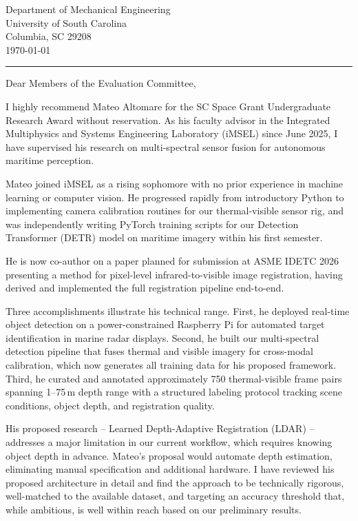 \documentclass[12pt]{article}
\begin{document}
\noindent
Department of Mechanical Engineering\\
University of South Carolina\\
Columbia, SC 29208\\
\today

\noindent
{\color{garnet}\rule{\textwidth}{0.5pt}}

\vspace{0.2em}

\noindent
Dear Members of the Evaluation Committee,

I highly recommend Mateo Altomare for the SC Space Grant Undergraduate Research Award without reservation. As his faculty advisor in the Integrated Multiphysics and Systems Engineering Laboratory (iMSEL) since June 2025, I have supervised his research on multi-spectral sensor fusion for autonomous maritime perception.

Mateo joined iMSEL as a rising sophomore with no prior experience in machine learning or computer vision. He progressed rapidly from introductory Python to implementing camera calibration routines for our thermal-visible sensor rig, and was independently writing PyTorch training scripts for our Detection Transformer (DETR) model on maritime imagery within his first semester.

He is now co-author on a paper planned for submission at ASME IDETC 2026 presenting a method for pixel-level infrared-to-visible image registration, having derived and implemented the full registration pipeline end-to-end.

Three accomplishments illustrate his technical range. First, he deployed real-time object detection on a power-constrained Raspberry Pi for automated target identification in marine radar displays. Second, he built our multi-spectral detection pipeline that fuses thermal and visible imagery for cross-modal calibration, which now generates all training data for his proposed framework. Third, he curated and annotated approximately 750 thermal-visible frame pairs spanning 1--75\,m depth range with a structured labeling protocol tracking scene conditions, object depth, and registration quality.

His proposed research -- Learned Depth-Adaptive Registration (LDAR) -- addresses a major limitation in our current workflow, which requires knowing object depth in advance. Mateo's proposal would automate depth estimation, eliminating manual specification and additional hardware. I have reviewed his proposed architecture in detail and find the approach to be technically rigorous, well-matched to the available dataset, and targeting an accuracy threshold that, while ambitious, is well within reach based on our preliminary results.
\end{document}

